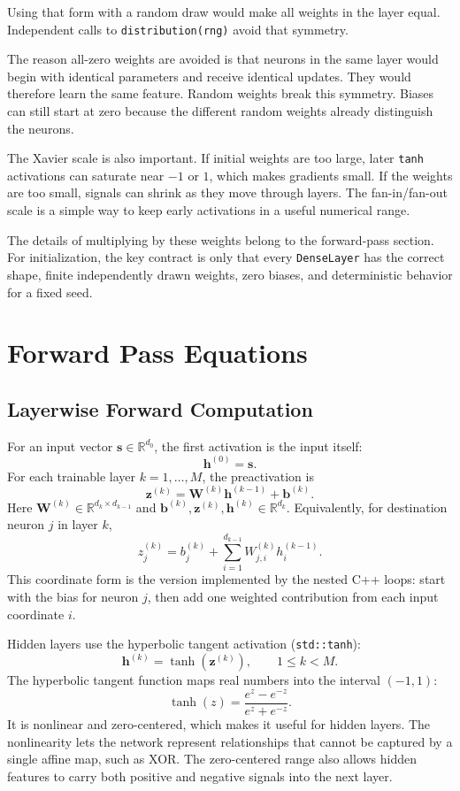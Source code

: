 \documentclass{article}
\begin{document}
Using that form with a random draw would make all weights in the layer
equal. Independent calls to \texttt{distribution(rng)} avoid that
symmetry.

The reason all-zero weights are avoided is that neurons in the same
layer would begin with identical parameters and receive identical
updates. They would therefore learn the same feature. Random weights
break this symmetry. Biases can still start at zero because the
different random weights already distinguish the neurons.

The Xavier scale is also important. If initial weights are too large,
later \texttt{tanh} activations can saturate near $-1$ or $1$, which
makes gradients small. If the weights are too small, signals can shrink
as they move through layers. The fan-in/fan-out scale is a simple way
to keep early activations in a useful numerical range.

The details of multiplying by these weights belong to the forward-pass
section. For initialization, the key contract is only that every
\texttt{DenseLayer} has the correct shape, finite independently drawn
weights, zero biases, and deterministic behavior for a fixed seed.

\pagebreak
\section{Forward Pass Equations}
\label{sec:forward-pass-equations}

\subsection{Layerwise Forward Computation}

For an input vector \(\mathbf{s}\in\mathbb{R}^{d_0}\), the first
activation is the input itself:
\[
  \mathbf{h}^{(0)} = \mathbf{s}.
\]
For each trainable layer \(k = 1,\ldots,M\), the preactivation is
\[
  \mathbf{z}^{(k)}
  =
  \mathbf{W}^{(k)}\mathbf{h}^{(k-1)} + \mathbf{b}^{(k)}.
\]
Here \(\mathbf{W}^{(k)}\in\mathbb{R}^{d_k\times d_{k-1}}\) and
\(\mathbf{b}^{(k)},\mathbf{z}^{(k)},\mathbf{h}^{(k)}\in
\mathbb{R}^{d_k}\). Equivalently, for destination neuron \(j\) in
layer \(k\),
\[
  z_j^{(k)}
  =
  b_j^{(k)}
  +
  \sum_{i=1}^{d_{k-1}}
  W_{j,i}^{(k)}h_i^{(k-1)}.
\]
This coordinate form is the version implemented by the nested C++
loops: start with the bias for neuron \(j\), then add one weighted
contribution from each input coordinate \(i\).

Hidden layers use the hyperbolic tangent activation
(\texttt{std::tanh}):
\[
  \mathbf{h}^{(k)} = \tanh\!\left(\mathbf{z}^{(k)}\right),
  \qquad
  1 \leq k < M.
\]
The hyperbolic tangent function maps real numbers into the interval
\((-1,1)\):
\[
  \tanh(z)
  =
  \frac{e^z-e^{-z}}{e^z+e^{-z}}.
\]
It is nonlinear and zero-centered, which makes it useful for hidden
layers. The nonlinearity lets the network represent relationships that
cannot be captured by a single affine map, such as XOR. The
zero-centered range also allows hidden features to carry both positive
and negative signals into the next layer.
\end{document}
